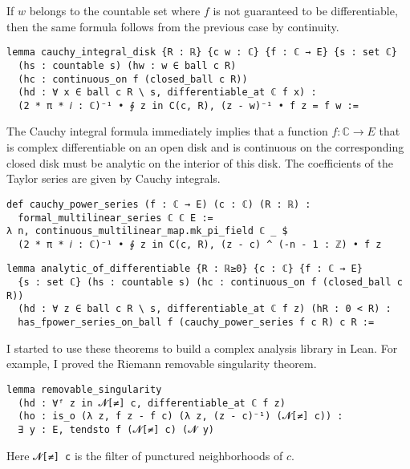 \documentclass[a4paper,UKenglish,cleveref, autoref, thm-restate]{lipics-v2021}
\newcommand{\bbC}{\mathbb{C}}
\begin{document}
If \(w\) belongs to the countable set where \(f\) is not guaranteed to
be differentiable, then the same formula follows from the previous case by
continuity.

\begin{lstlisting}[caption=Cauchy integral formula for a circle,label=lst:cauchy-int]
lemma cauchy_integral_disk {R : ℝ} {c w : ℂ} {f : ℂ → E} {s : set ℂ}
  (hs : countable s) (hw : w ∈ ball c R)
  (hc : continuous_on f (closed_ball c R))
  (hd : ∀ x ∈ ball c R \ s, differentiable_at ℂ f x) :
  (2 * π * 𝑖 : ℂ)⁻¹ • ∮ z in C(c, R), (z - w)⁻¹ • f z = f w :=
\end{lstlisting}

The Cauchy integral formula immediately implies that a function
\(f\colon\bbC\to E\) that is complex differentiable on an open disk
and is continuous on the corresponding closed disk must be analytic on
the interior of this disk. The coefficients of the Taylor series are
given by Cauchy integrals.

\begin{lstlisting}[caption=Power series for a function differentiable on a disk,label=lst:cauchy-series]
def cauchy_power_series (f : ℂ → E) (c : ℂ) (R : ℝ) :
  formal_multilinear_series ℂ ℂ E :=
λ n, continuous_multilinear_map.mk_pi_field ℂ _ $
  (2 * π * 𝑖 : ℂ)⁻¹ • ∮ z in C(c, R), (z - c) ^ (-n - 1 : ℤ) • f z
\end{lstlisting}

\begin{lstlisting}[caption=Analyticity of a complex differentiable function,label=lst:diff-analytic]
lemma analytic_of_differentiable {R : ℝ≥0} {c : ℂ} {f : ℂ → E}
  {s : set ℂ} (hs : countable s) (hc : continuous_on f (closed_ball c R))
  (hd : ∀ z ∈ ball c R \ s, differentiable_at ℂ f z) (hR : 0 < R) :
  has_fpower_series_on_ball f (cauchy_power_series f c R) c R :=
\end{lstlisting}

I started to use these theorems to build a complex analysis library in
Lean. For example, I proved the Riemann removable singularity theorem.

\begin{lstlisting}
lemma removable_singularity
  (hd : ∀ᶠ z in 𝓝[≠] c, differentiable_at ℂ f z)
  (ho : is_o (λ z, f z - f c) (λ z, (z - c)⁻¹) (𝓝[≠] c)) :
  ∃ y : E, tendsto f (𝓝[≠] c) (𝓝 y)
\end{lstlisting}

Here \lstinline{𝓝[≠] c} is the filter of punctured neighborhoods of
\(c\).
\end{document}
